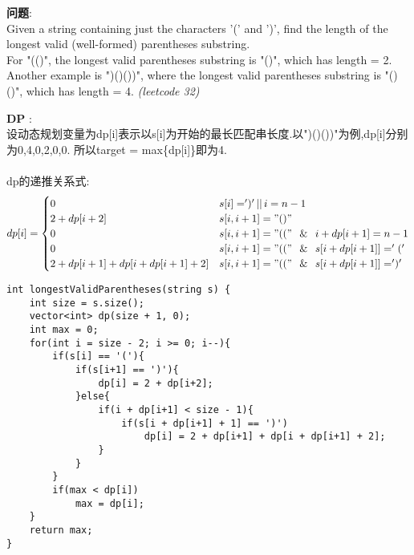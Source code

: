     
\begin{description}
    \item{\textbf{问题}}:\\
Given a string containing just the characters '(' and ')', find the length of the longest valid (well-formed) parentheses substring.\\
For "(()", the longest valid parentheses substring is "()", which has length = 2.\\
Another example is ")()())", where the longest valid parentheses substring is "()()", which has length = 4. \textit{(leetcode 32)}
    \item{\textbf{DP}} : 
    \\设动态规划变量为dp[i]表示以s[i]为开始的最长匹配串长度.以")()())"为例,dp[i]分别为0,4,0,2,0,0. 所以target = max\{dp[i]\}即为4.\\
	\\dp的递推关系式:
$$
dp[i] =
\begin{cases} 
0 & s[i]=')' \,||\, i=n-1  \\
2+dp[i+2] & s[i,i+1]="()" \\
0 & s[i,i+1]="((" \,\And\, i+dp[i+1]=n-1\\
0 & s[i,i+1]="((" \,\And\, s[i+dp[i+1]] = '('\\
2+dp[i+1]+dp[i+dp[i+1]+2] & s[i,i+1]="((" \,\And\, s[i+dp[i+1]] = ')'
\end{cases}
$$
    \begin{lstlisting}
int longestValidParentheses(string s) {
	int size = s.size();
	vector<int> dp(size + 1, 0);
	int max = 0;
	for(int i = size - 2; i >= 0; i--){
		if(s[i] == '('){
			if(s[i+1] == ')'){
				dp[i] = 2 + dp[i+2];
			}else{
				if(i + dp[i+1] < size - 1){
					if(s[i + dp[i+1] + 1] == ')')
						dp[i] = 2 + dp[i+1] + dp[i + dp[i+1] + 2];
				}
			}
		}
		if(max < dp[i])
			max = dp[i];
	}
	return max;
}
    \end{lstlisting}
    \textit{}
\end{description}

